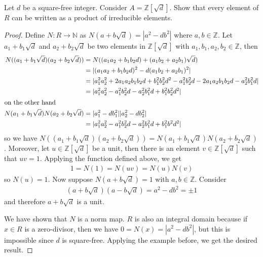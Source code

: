 \begin{example}
    Let \(d\) be a square-free integer. Consider \(A = \mathbb{Z}[\sqrt{d}]\). Show that every element of \(R\) can be written as a product of irreducible elements.
\end{example}
\begin{proof}
    Define \(N: R \longrightarrow \mathbb{N}\) as \(N(a + b \sqrt{d}) = |a^2 - d b^2|\) where \(a, b \in \mathbb{Z}\). Let \(a_1 + b_1 \sqrt{d}\) and \(a_2 + b_2 \sqrt{d}\) be two elements in \(\mathbb{Z}[\sqrt{d}]\) with \(a_1, b_1, a_2, b_2 \in \mathbb{Z}\), then
    \begin{align*}
        N((a_1 + b_1 \sqrt{d}) (a_2 + b_2 \sqrt{d})) &= N((a_1 a_2 + b_1 b_2 d) + (a_1 b_2 + a_2 b_1) \sqrt{d}) \\
        &= |(a_1 a_2 + b_1 b_2 d)^2 - d (a_1 b_2 + a_2 b_1)^2| \\
        &= |a_1^2 a_2^2 + 2 a_1 a_2 b_1 b_2 d + b_1^2 b_2^2 d^2 - a_1^2 b_2^2 d - 2 a_1 a_2 b_1 b_2 d - a_2^2 b_1^2 d | \\
        &= |a_1^2 a_2^2 - a_1^2 b_2^2 d - a_2^2 b_1^2 d + b_1^2 b_2^2 d^2| \\
        \intertext{on the other hand}
        N(a_1 + b_1 \sqrt{d})N(a_2 + b_2 \sqrt{d}) &= |a_1^2 - d b_1^2||a_2^2 - d b_2^2| \\
        &= |a_1^2 a_2^2 - a_1^2 b_2^2 d - a_2^2 b_1^2 d + b_1^2 b^2 d^2 |
    \end{align*}
    so we have \(N((a_1 + b_1 \sqrt{d}) (a_2 + b_2 \sqrt{d})) = N(a_1 + b_1 \sqrt{d})N(a_2 + b_2 \sqrt{d})\). Moreover, let \(u \in \mathbb{Z}[\sqrt{d}]\) be a unit, then there is an element \(v \in \mathbb{Z}[\sqrt{d}]\) such that \(u v = 1\). Applying the function defined above, we get
    \begin{align*}
        1 = N(1) = N(u v) = N(u) N(v)
    \end{align*}
    so \(N(u) = 1\). Now suppose \(N(a + b \sqrt{d}) = 1\) with \(a, b \in \mathbb{Z}\). Consider
    \begin{align*}
        (a + b \sqrt{d})(a - b \sqrt{d}) = a^2 - d b^2 = \pm 1
    \end{align*}
    and therefore \(a + b \sqrt{d}\) is a unit.

    We have shown that \(N\) is a norm map. \(R\) is also an integral domain because if \(x \in R\) is a zero-divisor, then we have \(0 = N(x) = |a^2 - d b^2|\), but this is impossible since \(d\) is square-free. Applying the example before, we get the desired result.
\end{proof}

